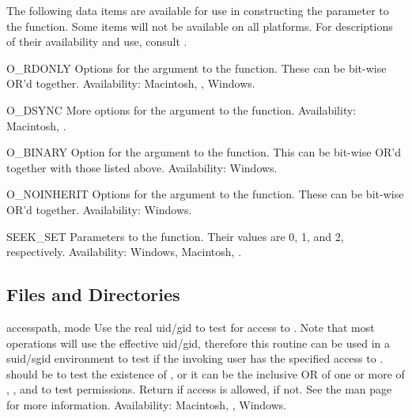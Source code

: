 The following data items are available for use in constructing the
 parameter to the  function.  Some items will
not be available on all platforms.  For descriptions of their availability
and use, consult .

\begin{datadesc}{O_RDONLY}
Options for the  argument to the  function.
These can be bit-wise OR'd together.
Availability: Macintosh, \UNIX, Windows.
\end{datadesc}

\begin{datadesc}{O_DSYNC}
More options for the  argument to the  function.
Availability: Macintosh, \UNIX.
\end{datadesc}

\begin{datadesc}{O_BINARY}
Option for the  argument to the  function.
This can be bit-wise OR'd together with those listed above.
Availability: Windows.
\end{datadesc}

\begin{datadesc}{O_NOINHERIT}
Options for the  argument to the  function.
These can be bit-wise OR'd together.
Availability: Windows.
\end{datadesc}

\begin{datadesc}{SEEK_SET}
Parameters to the  function.
Their values are 0, 1, and 2, respectively.
Availability: Windows, Macintosh, \UNIX.
\end{datadesc}

\subsection{Files and Directories \label{os-file-dir}}

\begin{funcdesc}{access}{path, mode}
Use the real uid/gid to test for access to .  Note that most
operations will use the effective uid/gid, therefore this routine can
be used in a suid/sgid environment to test if the invoking user has the
specified access to .   should be 
to test the existence of , or it can be the inclusive OR of
one or more of , , and  to
test permissions.  Return  if access is allowed,
 if not.
See the \UNIX{} man page  for more information.
Availability: Macintosh, \UNIX, Windows.
\end{funcdesc}

